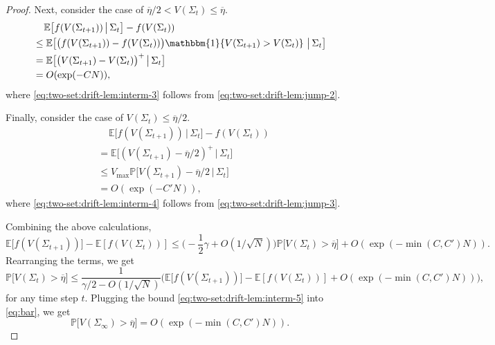 \documentclass[11pt,letterpaper]{article}
\theoremstyle{plain}
\theoremstyle{definition}
\theoremstyle{remark}
\newcommand{\E}[1]{\mathbb{E}\left[#1\right]}
\newcommand{\Ebig}[1]{\mathbb{E}\big[#1\big]}
\newcommand{\givenbig}{\,\big|\,}
\newcommand{\Probbig}[1]{\mathbb{P}\big[#1\big]}
\newcommand{\indibrac}[1]{\mathbbm{1}\!\left\{#1\right\}}
\newcommand{\threshbar}{\overline{\eta}}
\newcommand{\Fullstate}{\Sigma}
\begin{document}
\begin{proof}
    Next, consider the case of $\threshbar/2 < V(\Fullstate_{t}) \leq \threshbar$.
    \begin{align}
        \nonumber
         &\mspace{20mu} \Ebig{f(V(\Fullstate_{t+1})) \givenbig \Fullstate_t} - f(V(\Fullstate_t)) \\ 
         \nonumber
        &\leq  \Ebig{\big(f(V(\Fullstate_{t+1})) - f(V(\Fullstate_t))\big) \indibrac{V(\Fullstate_{t+1}) > V(\Fullstate_t)} \givenbig \Fullstate_t}  \\
        \nonumber
        &=  \Ebig{\big(V(\Fullstate_{t+1}) - V(\Fullstate_t)\big)^+ \givenbig \Fullstate_t} \\
        \label{eq:two-set:drift-lem:interm-3}
        &= O(\exp(-C N)),
    \end{align}
    where \eqref{eq:two-set:drift-lem:interm-3} follows from \eqref{eq:two-set:drift-lem:jump-2}. 

    Finally, consider the case of $V(\Fullstate_{t}) \leq \threshbar/2$.
    \begin{align}
        \nonumber
         &\mspace{20mu} \Ebig{f(V(\Fullstate_{t+1})) \givenbig \Fullstate_t} - f(V(\Fullstate_t)) \\ 
         \nonumber
         &= \Ebig{(V(\Fullstate_{t+1})-\threshbar/2)^+ \givenbig \Fullstate_t} \\
         \nonumber
         &\leq V_{\max} \Probbig{V(\Fullstate_{t+1})-\threshbar/2 \givenbig \Fullstate_t} \\
         \label{eq:two-set:drift-lem:interm-4}
         &= O(\exp(-C' N)),
    \end{align}
    where \eqref{eq:two-set:drift-lem:interm-4} follows from \eqref{eq:two-set:drift-lem:jump-3}. 

    Combining the above calculations, 
    \begin{equation*}
        \Ebig{f(V(\Fullstate_{t+1}))} - \E{f(V(\Fullstate_t))} 
        \leq \Big(-\frac{1}{2}\gamma + O(1/\sqrt{N}) \Big) \Probbig{V(\Fullstate_{t}) > \threshbar} + O(\exp(-\min(C, C') N)). 
    \end{equation*}
    Rearranging the terms, we get
    \begin{equation}
        \label{eq:two-set:drift-lem:interm-5}
        \Probbig{V(\Fullstate_{t}) > \threshbar} \leq \frac{1}{\gamma / 2 - O(1/\sqrt{N})}\Big( \Ebig{f(V(\Fullstate_{t+1}))} - \E{f(V(\Fullstate_t))} + O(\exp(-\min(C, C') N))\Big),
    \end{equation}
    for any time step $t$. 
    Plugging the bound \eqref{eq:two-set:drift-lem:interm-5} into \eqref{eq:bar}, we get 
    \[
        \Probbig{V(\Fullstate_{\infty}) > \threshbar} = O(\exp(-\min(C, C') N)).
    \]
\end{proof}
\end{document}
